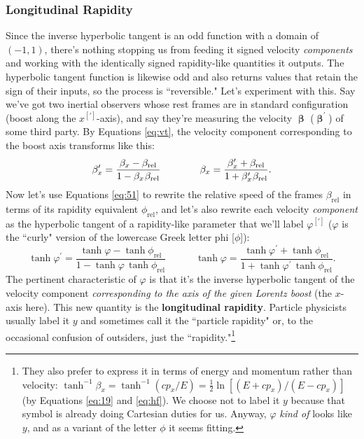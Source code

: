 \documentclass[12pt]{article}
\newcommand{\vvbeta}{\bm{\upbeta}}
\begin{document}
\subsubsection{Longitudinal Rapidity}

Since the inverse hyperbolic tangent is an odd function with a domain of $(-1, 1)$, there's nothing stopping us from feeding it signed velocity \emph{components} and working with the identically signed rapidity-like quantities it outputs. The hyperbolic tangent function is likewise odd and also returns values that retain the sign of their inputs, so the process is ``reversible." Let's experiment with this. Say we've got two inertial observers whose rest frames are in standard configuration (boost along the $x^{[\prime]}$-axis), and say they're measuring the velocity $\vvbeta$ ($\vvbeta^\prime$) of some third party. By Equations \ref{eq:vt}, the velocity component corresponding to the boost axis transforms like this:
\begin{equation*}
\beta_x^{\prime} = \frac{\beta_x - \beta_{\textrm{rel}}}{1 - \beta_{x} \mkern1mu \beta_{\textrm{rel}}} \qquad \qquad \beta_x = \frac{\beta_x^{\prime} + \beta_{\textrm{rel}}}{1 + \beta_x^{\prime} \mkern1mu \beta_{\textrm{rel}}}.
\end{equation*}
Now let's use Equations \ref{eq:51} to rewrite the relative speed of the frames $\beta_{\textrm{rel}}$ in terms of its rapidity equivalent $\phi_{\textrm{rel}}$, and let's also rewrite each velocity \emph{component} as the hyperbolic tangent of a rapidity-like parameter that we'll label $\varphi^{[\prime]}$ ($\varphi$ is the ``curly" version of the lowercase Greek letter phi [$\phi$]):
\begin{equation}\label{eq:th}
\tanh{\varphi^{\prime}} = \frac{\tanh{\varphi} - \tanh{\phi_{\textrm{rel}}}}{1 - \tanh{\varphi} \,  \tanh{\phi_{\textrm{rel}}}} \qquad \quad \tanh{\varphi} = \frac{\tanh{\varphi^{\prime}} + \tanh{\phi_{\textrm{rel}}}}{1 + \tanh{\varphi^{\prime}} \, \tanh{\phi_{\textrm{rel}}}} .
\end{equation}
The pertinent characteristic of $\varphi$ is that it's the inverse hyperbolic tangent of the velocity component \emph{corresponding to the axis of the given Lorentz boost} (the $x$-axis here). This new quantity is the \textbf{longitudinal rapidity}. Particle physicists usually label it $y$ and sometimes call it the ``particle rapidity" or, to the occasional confusion of outsiders, just the ``rapidity."\footnote{They also prefer to express it in terms of energy and momentum rather than velocity: $\tanh^{-1}{\beta_x} = \tanh^{-1}{(cp_x / E)} = \frac{1}{2} \ln{[(E + cp_x) / (E - cp_x) ]}$ (by Equations \ref{eq:19} and \ref{eq:hf}). We choose not to label it $y$ because that symbol is already doing Cartesian duties for us. Anyway, $\varphi$ \emph{kind of} looks like $y$, and as a variant of the letter $\phi$ it seems fitting.}
\end{document}
